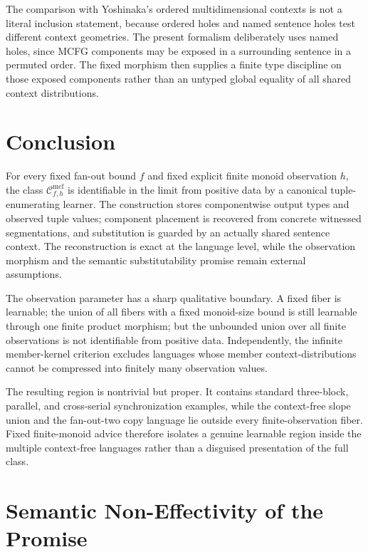 \documentclass[11pt,a4paper]{article}
\theoremstyle{remark}
\newcommand{\Cmcf}[2]{\mathcal{C}^{\mathrm{mcf}}_{#1,#2}}
\begin{document}
The comparison with Yoshinaka's ordered multidimensional contexts is not a
literal inclusion statement, because ordered holes and named sentence holes test
different context geometries.  The present formalism deliberately uses named
holes, since MCFG components may be exposed in a surrounding sentence in a
permuted order.  The fixed morphism then supplies a finite type discipline on
those exposed components rather than an untyped global equality of all shared
context distributions.



\section{Conclusion}
\label{sec:conclusion}

For every fixed fan-out bound \(f\) and fixed explicit finite monoid observation
\(h\), the class \(\Cmcf{f}{h}\) is identifiable in the limit from positive
data by a canonical tuple-enumerating learner.  The construction stores
componentwise output types and observed tuple values; component placement is
recovered from concrete witnessed segmentations, and substitution is guarded
by an actually shared sentence context.  The reconstruction is exact at the
language level, while the observation morphism and the semantic
substitutability promise remain external assumptions.

The observation parameter has a sharp qualitative boundary.  A fixed fiber is
learnable; the union of all fibers with a fixed monoid-size bound is still
learnable through one finite product morphism; but the unbounded union over all
finite observations is not identifiable from positive data.  Independently,
the infinite member-kernel criterion excludes languages whose member
context-distributions cannot be compressed into finitely many observation
values.

The resulting region is nontrivial but proper.  It contains standard
three-block, parallel, and cross-serial synchronization examples, while the
context-free slope union and the fan-out-two copy language lie outside every
finite-observation fiber.  Fixed finite-monoid advice therefore isolates a
genuine learnable region inside the multiple context-free languages rather
than a disguised presentation of the full class.


\appendix
\section{Semantic Non-Effectivity of the Promise}
\label{app:semantic-promise}
\end{document}
